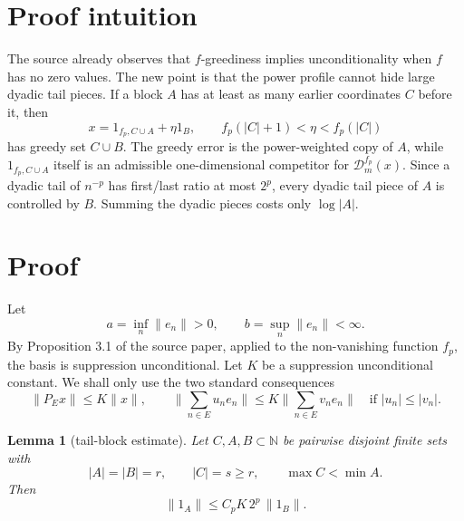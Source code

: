 \documentclass[11pt]{article}
\newtheorem{lemma}{Lemma}
\theoremstyle{definition}
\newcommand{\N}{\mathbb N}
\newcommand{\calD}{\mathcal D}
\newcommand{\fp}{f_p}
\begin{document}
\section*{Proof intuition}

The source already observes that \(f\)-greediness implies unconditionality
when \(f\) has no zero values.  The new point is that the power profile cannot
hide large dyadic tail pieces.  If a block \(A\) has at least as many earlier
coordinates \(C\) before it, then
\[
        x=1_{\fp,C\cup A}+\eta 1_B,
        \qquad \fp(|C|+1)<\eta<\fp(|C|)
\]
has greedy set \(C\cup B\).  The greedy error is the power-weighted copy of
\(A\), while \(1_{\fp,C\cup A}\) itself is an admissible one-dimensional
competitor for \(\calD_m^{\fp}(x)\).  Since a dyadic tail of \(n^{-p}\) has
first/last ratio at most \(2^p\), every dyadic tail piece of \(A\) is
controlled by \(B\).  Summing the dyadic pieces costs only \(\log |A|\).

\section*{Proof}

Let
\[
        a=\inf_n \|e_n\|>0,\qquad b=\sup_n\|e_n\|<\infty.
\]
By Proposition 3.1 of the source paper, applied to the non-vanishing function
\(\fp\), the basis is suppression unconditional.  Let \(K\) be a suppression
unconditional constant.  We shall only use the two standard consequences
\[
        \|P_E x\|\le K\|x\|,
        \qquad
        \Big\|\sum_{n\in E} u_n e_n\Big\|
        \le K\Big\|\sum_{n\in E} v_n e_n\Big\|
        \quad\text{if } |u_n|\le |v_n|.
        \tag{3}
\]

\begin{lemma}[tail-block estimate]\label{lem:tail}
Let \(C,A,B\subset\N\) be pairwise disjoint finite sets with
\[
        |A|=|B|=r,\qquad |C|=s\ge r,\qquad \max C<\min A .
\]
Then
\[
        \|1_A\|\le C_p K\,2^p\,\|1_B\|.
        \tag{4}
\]
\end{lemma}
\end{document}
